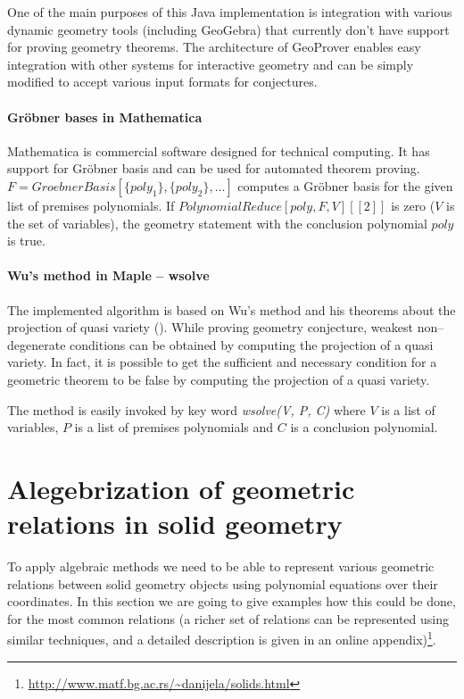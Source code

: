 \documentclass[final,1p,times,authoryear]{elsarticle}
\begin{document}
One of the main purposes of this Java implementation is integration
with various dynamic geometry tools (including GeoGebra) that
currently don't have support for proving geometry theorems. The
architecture of GeoProver enables easy integration with other systems
for interactive geometry and can be simply modified to accept various
input formats for conjectures.

\paragraph{Gr\"obner bases in Mathematica}

Mathematica is commercial software designed for technical
computing. It has support for Gr\"obner basis and can be used for
automated theorem proving.
$F = GroebnerBasis[\{poly_1\}, \{poly_2\}, \ldots]$ computes a
Gr\"obner basis for the given list of premises polynomials. If
$PolynomialReduce[poly, F, V][[2]]$ is zero ($V$ is the set of
variables), the geometry statement with the conclusion polynomial
$poly$ is true.

\paragraph{Wu's method in Maple -- wsolve}

The implemented algorithm is based on Wu's method and his theorems
about the projection of quasi variety (\cite{quasivarieties}). While
proving geometry conjecture, weakest non--degenerate conditions can be
obtained by computing the projection of a quasi variety. In fact, it
is possible to get the sufficient and necessary condition for a
geometric theorem to be false by computing the projection of a quasi
variety.

The method is easily invoked by key word \emph{wsolve(V, P, C)} where
$V$ is a list of variables, $P$ is a list of premises polynomials and
$C$ is a conclusion polynomial.

\section{Alegebrization of geometric relations in solid geometry}
\label{polynomials}
To apply algebraic methods we need to be able to represent various
geometric relations between solid geometry objects using polynomial
equations over their coordinates. In this section we are going to give
examples how this could be done, for the most common relations (a
richer set of relations can be represented using similar techniques,
and a detailed description is given in an online
appendix)\footnote{\url{http://www.matf.bg.ac.rs/~danijela/solids.html}}.
\end{document}
